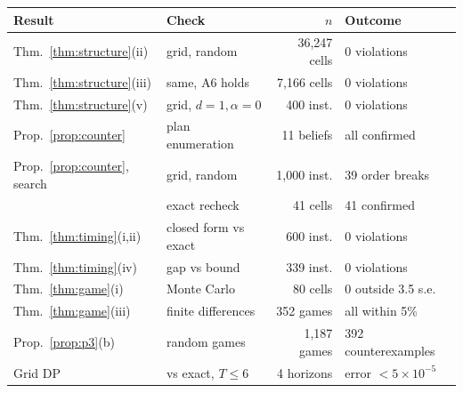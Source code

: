 \footnotesize
\setlength{\tabcolsep}{2.4pt}
\begin{tabular}{@{}llrl@{}}
\toprule
Result & Check & $n$ & Outcome \\
\midrule
Thm.~\ref{thm:structure}(ii) & grid, random & 36{,}247 cells & 0 violations \\
Thm.~\ref{thm:structure}(iii) & same, A6 holds & 7{,}166 cells & 0 violations \\
Thm.~\ref{thm:structure}(v) & grid, $d{=}1,\alpha{=}0$ & 400 inst. & 0 violations \\
Prop.~\ref{prop:counter} & plan enumeration & 11 beliefs & all confirmed \\
Prop.~\ref{prop:counter}, search & grid, random & 1{,}000 inst. & 39 order breaks \\
 & exact recheck & 41 cells & 41 confirmed \\
Thm.~\ref{thm:timing}(i,ii) & closed form vs exact & 600 inst. & 0 violations \\
Thm.~\ref{thm:timing}(iv) & gap vs bound & 339 inst. & 0 violations \\
Thm.~\ref{thm:game}(i) & Monte Carlo & 80 cells & 0 outside 3.5 s.e. \\
Thm.~\ref{thm:game}(iii) & finite differences & 352 games & all within 5\% \\
Prop.~\ref{prop:p3}(b) & random games & 1{,}187 games & 392 counterexamples \\
Grid DP & vs exact, $T\le6$ & 4 horizons & error $<$$5\times10^{-5}$ \\
\bottomrule
\end{tabular}
